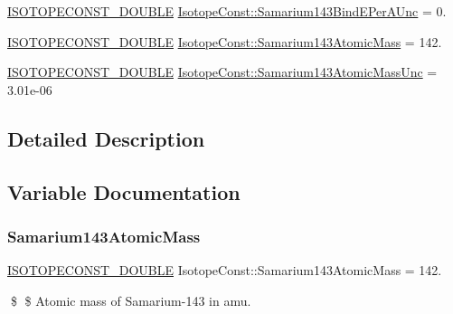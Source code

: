 \begin{DoxyCompactItemize}
\mbox{\hyperlink{group___isotope_const-_macros_ga8f45a7272ce02c0b4c65c44636ed719a}{I\+S\+O\+T\+O\+P\+E\+C\+O\+N\+S\+T\+\_\+\+D\+O\+U\+B\+LE}} \mbox{\hyperlink{group___isotope_const-_samarium-_sm143_ga03e55bdb99f2ccad567dc17bb8da9786}{Isotope\+Const\+::\+Samarium143\+Bind\+E\+Per\+A\+Unc}} = 0.
\item 
\mbox{\hyperlink{group___isotope_const-_macros_ga8f45a7272ce02c0b4c65c44636ed719a}{I\+S\+O\+T\+O\+P\+E\+C\+O\+N\+S\+T\+\_\+\+D\+O\+U\+B\+LE}} \mbox{\hyperlink{group___isotope_const-_samarium-_sm143_ga455d51d0450085aee4a90ff0e4c743ad}{Isotope\+Const\+::\+Samarium143\+Atomic\+Mass}} = 142.
\item 
\mbox{\hyperlink{group___isotope_const-_macros_ga8f45a7272ce02c0b4c65c44636ed719a}{I\+S\+O\+T\+O\+P\+E\+C\+O\+N\+S\+T\+\_\+\+D\+O\+U\+B\+LE}} \mbox{\hyperlink{group___isotope_const-_samarium-_sm143_ga7f273568e53678f6e64b1951634129cd}{Isotope\+Const\+::\+Samarium143\+Atomic\+Mass\+Unc}} = 3.\+01e-\/06
\end{DoxyCompactItemize}


\subsection{Detailed Description}


\subsection{Variable Documentation}
\mbox{\label{group___isotope_const-_samarium-_sm143_ga455d51d0450085aee4a90ff0e4c743ad}} 
\subsubsection{\texorpdfstring{Samarium143\+Atomic\+Mass}{Samarium143AtomicMass}}
{\footnotesize\ttfamily \mbox{\hyperlink{group___isotope_const-_macros_ga8f45a7272ce02c0b4c65c44636ed719a}{I\+S\+O\+T\+O\+P\+E\+C\+O\+N\+S\+T\+\_\+\+D\+O\+U\+B\+LE}} Isotope\+Const\+::\+Samarium143\+Atomic\+Mass = 142.}

\$ \$ Atomic mass of Samarium-\/143 in amu. \mbox{\label{group___isotope_const-_samarium-_sm143_ga7f273568e53678f6e64b1951634129cd}} 
